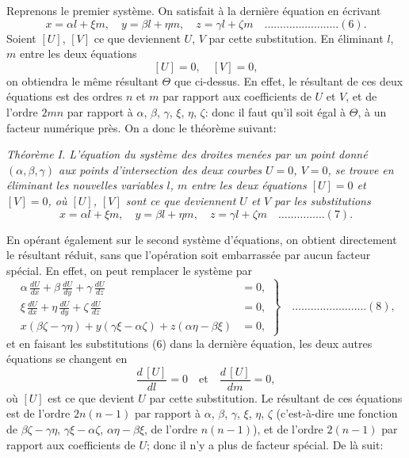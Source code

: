 \documentclass[12pt,a4paper]{article}
\theoremstyle{plain}
\begin{document}
Reprenons le premier syst\`eme. On satisfait \`a la derni\`ere \'equation en \'ecrivant
\[
x = \alpha l + \xi m, \quad y = \beta l + \eta m, \quad z = \gamma l + \zeta m \quad \ldots \ldots \ldots \ldots \ldots \ldots \ldots \ldots (6).
\]
Soient $[U]$, $[V]$ ce que deviennent $U$, $V$ par cette substitution. En \'eliminant $l$, $m$ entre les deux \'equations
\[
[U] = 0, \quad [V] = 0,
\]
on obtiendra le m\^eme r\'esultant $\Theta$ que ci-dessus. En effet, le r\'esultant de ces deux \'equations est des ordres $n$ et $m$ par rapport aux coefficients de $U$ et $V$, et de l'ordre $2mn$ par rapport \`a $\alpha$, $\beta$, $\gamma$, $\xi$, $\eta$, $\zeta$: donc il faut qu'il soit \'egal \`a $\Theta$, \`a un facteur num\'erique pr\`es. On a donc le th\'eor\`eme suivant:

\smallskip
\textit{Th\'eor\`eme I. L'\'equation du syst\`eme des droites men\'ees par un point donn\'e $(\alpha, \beta, \gamma)$ aux points d'intersection des deux courbes $U = 0$, $V = 0$, se trouve en \'eliminant les nouvelles variables $l$, $m$ entre les deux \'equations $[U] = 0$ et $[V] = 0$, o\`u $[U]$, $[V]$ sont ce que deviennent $U$ et $V$ par les substitutions
\[
x = \alpha l + \xi m, \quad y = \beta l + \eta m, \quad z = \gamma l + \zeta m \quad \ldots \ldots \ldots \ldots \ldots (7).
\]}
\smallskip

En op\'erant \'egalement sur le second syst\`eme d'\'equations, on obtient directement le r\'esultant r\'eduit, sans que l'op\'eration soit embarrass\'ee par aucun facteur sp\'ecial. En effet, on peut remplacer le syst\`eme par
\[
\left. \begin{aligned}
\alpha\,\frac{dU}{dx} + \beta\,\frac{dU}{dy} + \gamma\,\frac{dU}{dz} &= 0, \\
\xi\,\frac{dU}{dx} + \eta\,\frac{dU}{dy} + \zeta\,\frac{dU}{dz} &= 0, \\
x(\beta\zeta - \gamma\eta) + y(\gamma\xi - \alpha\zeta) + z(\alpha\eta - \beta\xi) &= 0,
\end{aligned} \right\} \quad \ldots \ldots \ldots \ldots \ldots \ldots \ldots \ldots (8),
\]
et en faisant les substitutions (6) dans la derni\`ere \'equation, les deux autres \'equations se changent en
\[
\frac{d\,[U]}{dl} = 0 \quad \text{et} \quad \frac{d\,[U]}{dm} = 0,
\]
o\`u $[U]$ est ce que devient $U$ par cette substitution. Le r\'esultant de ces \'equations est de l'ordre $2n(n-1)$ par rapport \`a $\alpha$, $\beta$, $\gamma$, $\xi$, $\eta$, $\zeta$ (c'est-\`a-dire une fonction de $\beta\zeta - \gamma\eta$, $\gamma\xi - \alpha\zeta$, $\alpha\eta - \beta\xi$, de l'ordre $n(n-1)$), et de l'ordre $2(n-1)$ par rapport aux coefficients de $U$; donc il n'y a plus de facteur sp\'ecial. De l\`a suit:
\end{document}
